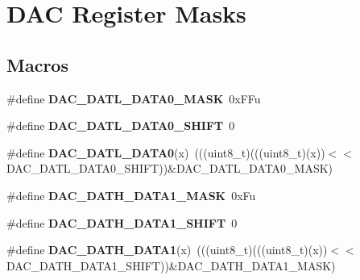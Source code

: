 \hypertarget{group___d_a_c___register___masks}{}\section{D\+AC Register Masks}
\label{group___d_a_c___register___masks}
\subsection*{Macros}
\begin{DoxyCompactItemize}
\item 
\mbox{\label{group___d_a_c___register___masks_ga06d752efe9ec5bab7d61ccf9c2689345}} 
\#define {\bfseries D\+A\+C\+\_\+\+D\+A\+T\+L\+\_\+\+D\+A\+T\+A0\+\_\+\+M\+A\+SK}~0x\+F\+Fu
\item 
\mbox{\label{group___d_a_c___register___masks_gad9030129a0f34502c115abd36728d001}} 
\#define {\bfseries D\+A\+C\+\_\+\+D\+A\+T\+L\+\_\+\+D\+A\+T\+A0\+\_\+\+S\+H\+I\+FT}~0
\item 
\mbox{\label{group___d_a_c___register___masks_ga87995bd867b0ea7e137b5a5a8cbfdf1e}} 
\#define {\bfseries D\+A\+C\+\_\+\+D\+A\+T\+L\+\_\+\+D\+A\+T\+A0}(x)~(((uint8\+\_\+t)(((uint8\+\_\+t)(x))$<$$<$D\+A\+C\+\_\+\+D\+A\+T\+L\+\_\+\+D\+A\+T\+A0\+\_\+\+S\+H\+I\+FT))\&D\+A\+C\+\_\+\+D\+A\+T\+L\+\_\+\+D\+A\+T\+A0\+\_\+\+M\+A\+SK)
\item 
\mbox{\label{group___d_a_c___register___masks_ga98c0e999ae86d666b5d6fa8df700ba6f}} 
\#define {\bfseries D\+A\+C\+\_\+\+D\+A\+T\+H\+\_\+\+D\+A\+T\+A1\+\_\+\+M\+A\+SK}~0x\+Fu
\item 
\mbox{\label{group___d_a_c___register___masks_ga0056432036b350d3839554982acfbff1}} 
\#define {\bfseries D\+A\+C\+\_\+\+D\+A\+T\+H\+\_\+\+D\+A\+T\+A1\+\_\+\+S\+H\+I\+FT}~0
\item 
\mbox{\label{group___d_a_c___register___masks_ga22ebc926dfe59f28a37b532767780fbc}} 
\#define {\bfseries D\+A\+C\+\_\+\+D\+A\+T\+H\+\_\+\+D\+A\+T\+A1}(x)~(((uint8\+\_\+t)(((uint8\+\_\+t)(x))$<$$<$D\+A\+C\+\_\+\+D\+A\+T\+H\+\_\+\+D\+A\+T\+A1\+\_\+\+S\+H\+I\+FT))\&D\+A\+C\+\_\+\+D\+A\+T\+H\+\_\+\+D\+A\+T\+A1\+\_\+\+M\+A\+SK)

\end{DoxyCompactItemize}
